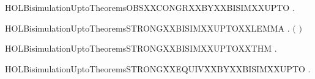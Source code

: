 \newcommand{\HOLBisimulationUptoTheoremsOBSXXBISIMXXUPTOXXWEAKXXTRANSXXlabelYY}{\UseVerbatim{HOLBisimulationUptoTheoremsOBSXXBISIMXXUPTOXXWEAKXXTRANSXXlabelYY}}
\begin{SaveVerbatim}{HOLBisimulationUptoTheoremsOBSXXCONGRXXBYXXBISIMXXUPTO}
\HOLTokenTurnstile{} \HOLSymConst{\HOLTokenForall{}}  .   \HOLSymConst{\HOLTokenConj{}}    \HOLSymConst{\HOLTokenImp{}}   
\end{SaveVerbatim}
\newcommand{\HOLBisimulationUptoTheoremsOBSXXCONGRXXBYXXBISIMXXUPTO}{\UseVerbatim{HOLBisimulationUptoTheoremsOBSXXCONGRXXBYXXBISIMXXUPTO}}
\begin{SaveVerbatim}{HOLBisimulationUptoTheoremsSTRONGXXBISIMXXUPTOXXLEMMA}
\HOLTokenTurnstile{} \HOLSymConst{\HOLTokenForall{}}.
         \HOLSymConst{\HOLTokenImp{}}
        \ensuremath{(}    \ensuremath{)}
\end{SaveVerbatim}
\newcommand{\HOLBisimulationUptoTheoremsSTRONGXXBISIMXXUPTOXXLEMMA}{\UseVerbatim{HOLBisimulationUptoTheoremsSTRONGXXBISIMXXUPTOXXLEMMA}}
\begin{SaveVerbatim}{HOLBisimulationUptoTheoremsSTRONGXXBISIMXXUPTOXXTHM}
\HOLTokenTurnstile{} \HOLSymConst{\HOLTokenForall{}}.   \HOLSymConst{\HOLTokenImp{}}   
\end{SaveVerbatim}
\newcommand{\HOLBisimulationUptoTheoremsSTRONGXXBISIMXXUPTOXXTHM}{\UseVerbatim{HOLBisimulationUptoTheoremsSTRONGXXBISIMXXUPTOXXTHM}}
\begin{SaveVerbatim}{HOLBisimulationUptoTheoremsSTRONGXXEQUIVXXBYXXBISIMXXUPTO}
\HOLTokenTurnstile{} \HOLSymConst{\HOLTokenForall{}}  .   \HOLSymConst{\HOLTokenConj{}}    \HOLSymConst{\HOLTokenImp{}}   
\end{SaveVerbatim}
\newcommand{\HOLBisimulationUptoTheoremsSTRONGXXEQUIVXXBYXXBISIMXXUPTO}{\UseVerbatim{HOLBisimulationUptoTheoremsSTRONGXXEQUIVXXBYXXBISIMXXUPTO}}
